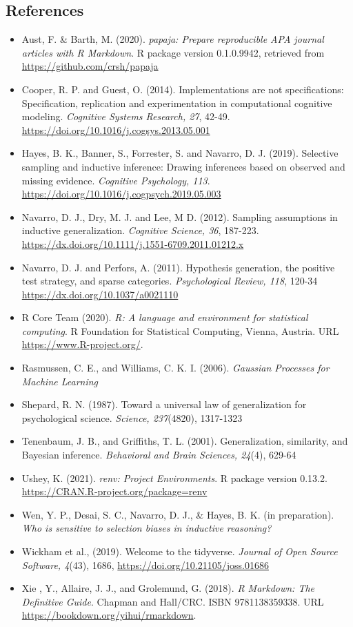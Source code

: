 \documentclass[
  english,
  doc]{apa6}
\providecommand{\tightlist}{%
  \setlength{\itemsep}{0pt}\setlength{\parskip}{0pt}}
\begin{document}
\hypertarget{references}{%
\subsection{References}\label{references}}

\begin{itemize}
\tightlist
\item
  Aust, F. \& Barth, M. (2020). \emph{papaja: Prepare reproducible APA journal
  articles with R Markdown}. R package version 0.1.0.9942, retrieved from
  \url{https://github.com/crsh/papaja}
\item
  Cooper, R. P. and Guest, O. (2014). Implementations are not specifications: Specification, replication and experimentation in computational cognitive modeling. \emph{Cognitive Systems Research, 27}, 42-49. \url{https://doi.org/10.1016/j.cogsys.2013.05.001}
\item
  Hayes, B. K., Banner, S., Forrester, S. and Navarro, D. J. (2019). Selective sampling and inductive inference: Drawing inferences based on observed and missing evidence. \emph{Cognitive Psychology, 113}. \url{https://doi.org/10.1016/j.cogpsych.2019.05.003}
\item
  Navarro, D. J., Dry, M. J. and Lee, M D. (2012). Sampling assumptions in inductive generalization. \emph{Cognitive Science, 36}, 187-223. \url{https://dx.doi.org/10.1111/j.1551-6709.2011.01212.x}
\item
  Navarro, D. J. and Perfors, A. (2011). Hypothesis generation, the positive test strategy, and sparse categories. \emph{Psychological Review, 118}, 120-34 \url{https://dx.doi.org/10.1037/a0021110}
\item
  R Core Team (2020). \emph{R: A language and environment for statistical computing}. R Foundation for Statistical Computing, Vienna, Austria. URL
  \url{https://www.R-project.org/}.
\item
  Rasmussen, C. E., and Williams, C. K. I. (2006). \emph{Gaussian Processes for Machine Learning}
\item
  Shepard, R. N. (1987). Toward a universal law of generalization for psychological science. \emph{Science, 237}(4820), 1317-1323
\item
  Tenenbaum, J. B., and Griffiths, T. L. (2001). Generalization, similarity, and Bayesian inference. \emph{Behavioral and Brain Sciences, 24}(4), 629-64
\item
  Ushey, K. (2021). \emph{renv: Project Environments}. R package version 0.13.2.
  \url{https://CRAN.R-project.org/package=renv}
\item
  Wen, Y. P., Desai, S. C., Navarro, D. J., \& Hayes, B. K. (in preparation). \emph{Who is sensitive to selection biases in inductive reasoning?}
\item
  Wickham et al., (2019). Welcome to the tidyverse. \emph{Journal of Open Source Software, 4}(43), 1686, \url{https://doi.org/10.21105/joss.01686}
\item
  Xie , Y., Allaire, J. J., and Grolemund, G. (2018). \emph{R Markdown: The Definitive Guide}. Chapman and Hall/CRC. ISBN 9781138359338. URL \url{https://bookdown.org/yihui/rmarkdown}.
\end{itemize}
\end{document}
